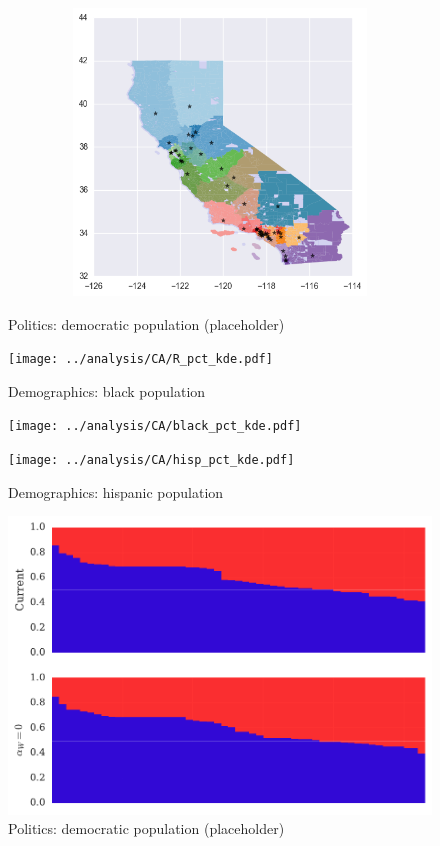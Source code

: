 \begin{figure}[htb!]
\includegraphics[width=5in,height=3in,keepaspectratio]{../maps/CA/static/0_25_after.png}
\end{figure}

\clearpage
\newpage

\begin{figure}[htb!] \centering
\caption{ Politics: democratic population (placeholder)}
\texttt{[image: ../analysis/CA/R\_pct\_kde.pdf]}
\caption{ Demographics: black population }
\texttt{[image: ../analysis/CA/black\_pct\_kde.pdf]}
\caption{ Demographics: hispanic population }
\texttt{[image: ../analysis/CA/hisp\_pct\_kde.pdf]}
\end{figure}

\clearpage
\newpage

\begin{figure}[htb!] \centering
\caption{ Politics: democratic population (placeholder)}
\includegraphics[width=6in]{../analysis/CA/barplot.pdf}
\end{figure}

